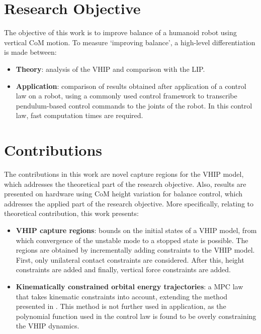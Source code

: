 \section{Research Objective}
The objective of this work is to improve balance of a humanoid robot using vertical \ac{CoM} motion. To measure `improving balance', a high-level differentiation is made between:
\begin{itemize}
	\item \textbf{Theory}: analysis of the \acf{VHIP} and comparison with the \acf{LIP}.
	\item \textbf{Application}: comparison of results obtained after application of a control law on a robot, using a commonly used control framework to transcribe pendulum-based control commands to the joints of the robot. In this control law, fast computation times are required.
\end{itemize}

\section{Contributions}
The contributions in this work are novel capture regions for the \acf{VHIP} model, which addresses the theoretical part of the research objective. Also, results are presented on hardware using \ac{CoM} height variation for balance control, which addresses the applied part of the research objective. More specifically, relating to theoretical contribution, this work presents:
\begin{itemize}
	\item \textbf{\ac{VHIP} capture regions}: bounds on the initial states of a \ac{VHIP} model, from which convergence of the unstable mode to a stopped state is possible. The regions are obtained by incrementally adding constraints to the \ac{VHIP} model. First, only unilateral contact constraints are considered. After this, height constraints are added and finally, vertical force constraints are added.
      \item \textbf{Kinematically constrained orbital energy trajectories}: a \ac{MPC} law that takes kinematic constraints into account, extending the method presented in \cite{koolen2016balance}. This method is not further used in application, as the polynomial function used in the control law is found to be overly constraining the \ac{VHIP} dynamics.
\end{itemize}

